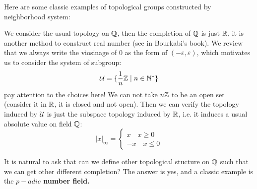 Here are some classic examples of topological groups constructed by neighborhood system:
\begin{example}
    We consider the usual topology on \(\mathbb{Q}\), then the completion of \(\mathbb{Q}\) is just \(\mathbb{R}\), it is another method to construct real number (see in Bourkabi's book). We review that we always write the viosinage of \(0\) as the form of \((-\varepsilon, \varepsilon)\), which motivates us to consider the system of subgroup:
    \[\mathcal{U} = \{\frac{1}{n}\mathbb{Z} \mid n \in \mathbb{N}^*\}\]
    pay attention to the choices here! We can not take \(n\mathbb{Z}\) to be an open set (consider it in \(\mathbb{R}\), it is closed and not open). Then we can verify the topology induced by \(\mathcal{U}\) is just the subspace topology induced by \(\mathbb{R}\), i.e. it induces a usual absolute value on field \(\mathbb{Q}\):
    \[|x|_{\infty} = \begin{cases}
        x \quad x\geq 0 \\
        -x \quad x \leq 0
    \end{cases}\]
\end{example}
It is natural to ask that can we define other topological stucture on \(\mathbb{Q}\) such that we can get other different completion? The answer is yes, and a classic example is the \textbf{\(p-adic\) number field.}
